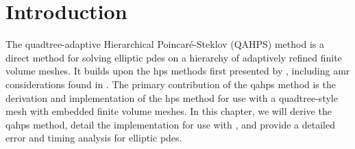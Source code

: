 \section{Introduction}
\label{sec:intro}

The quadtree-adaptive Hierarchical Poincar\'e-Steklov (QAHPS) method is a direct method for solving elliptic \gls{pdes} on a hierarchy of adaptively refined finite volume meshes. It builds upon the \gls{hps} methods first presented by \citet{gillman2014direct}, including \gls{amr} considerations found in \citep{babb2018accelerated,geldermans2019adaptive}. The primary contribution of the \gls{qahps} method is the derivation and implementation of the \gls{hps} method for use with a quadtree-style mesh with embedded finite volume meshes. In this chapter, we will derive the \gls{qahps} method, detail the implementation for use with \pforest \citep{burstedde2011p4est,burstedde2020parallel}, and provide a detailed error and timing analysis for elliptic \gls{pdes}.